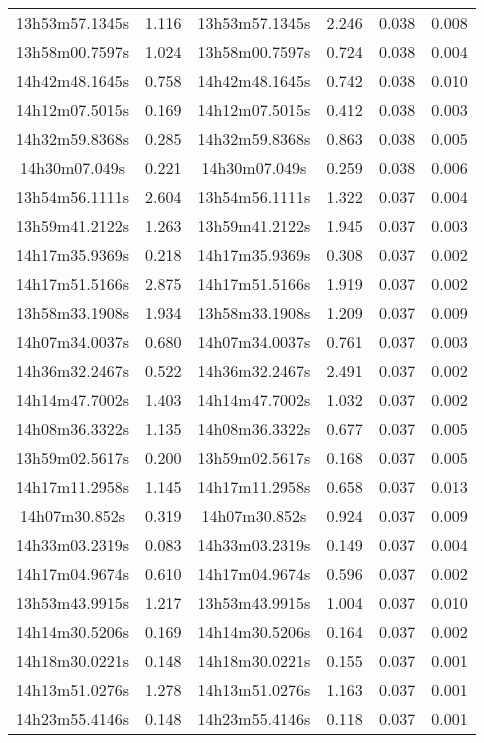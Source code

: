 \begin{table}
\begin{tabular}{cccccc}
13h53m57.1345s & 1.116 & 13h53m57.1345s & 2.246 & 0.038 & 0.008 \\
13h58m00.7597s & 1.024 & 13h58m00.7597s & 0.724 & 0.038 & 0.004 \\
14h42m48.1645s & 0.758 & 14h42m48.1645s & 0.742 & 0.038 & 0.010 \\
14h12m07.5015s & 0.169 & 14h12m07.5015s & 0.412 & 0.038 & 0.003 \\
14h32m59.8368s & 0.285 & 14h32m59.8368s & 0.863 & 0.038 & 0.005 \\
14h30m07.049s & 0.221 & 14h30m07.049s & 0.259 & 0.038 & 0.006 \\
13h54m56.1111s & 2.604 & 13h54m56.1111s & 1.322 & 0.037 & 0.004 \\
13h59m41.2122s & 1.263 & 13h59m41.2122s & 1.945 & 0.037 & 0.003 \\
14h17m35.9369s & 0.218 & 14h17m35.9369s & 0.308 & 0.037 & 0.002 \\
14h17m51.5166s & 2.875 & 14h17m51.5166s & 1.919 & 0.037 & 0.002 \\
13h58m33.1908s & 1.934 & 13h58m33.1908s & 1.209 & 0.037 & 0.009 \\
14h07m34.0037s & 0.680 & 14h07m34.0037s & 0.761 & 0.037 & 0.003 \\
14h36m32.2467s & 0.522 & 14h36m32.2467s & 2.491 & 0.037 & 0.002 \\
14h14m47.7002s & 1.403 & 14h14m47.7002s & 1.032 & 0.037 & 0.002 \\
14h08m36.3322s & 1.135 & 14h08m36.3322s & 0.677 & 0.037 & 0.005 \\
13h59m02.5617s & 0.200 & 13h59m02.5617s & 0.168 & 0.037 & 0.005 \\
14h17m11.2958s & 1.145 & 14h17m11.2958s & 0.658 & 0.037 & 0.013 \\
14h07m30.852s & 0.319 & 14h07m30.852s & 0.924 & 0.037 & 0.009 \\
14h33m03.2319s & 0.083 & 14h33m03.2319s & 0.149 & 0.037 & 0.004 \\
14h17m04.9674s & 0.610 & 14h17m04.9674s & 0.596 & 0.037 & 0.002 \\
13h53m43.9915s & 1.217 & 13h53m43.9915s & 1.004 & 0.037 & 0.010 \\
14h14m30.5206s & 0.169 & 14h14m30.5206s & 0.164 & 0.037 & 0.002 \\
14h18m30.0221s & 0.148 & 14h18m30.0221s & 0.155 & 0.037 & 0.001 \\
14h13m51.0276s & 1.278 & 14h13m51.0276s & 1.163 & 0.037 & 0.001 \\
14h23m55.4146s & 0.148 & 14h23m55.4146s & 0.118 & 0.037 & 0.001 \\

\end{tabular}
\end{table}
